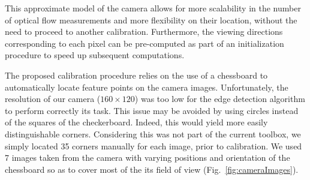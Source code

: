 This approximate model of the camera allows for more scalability in the number of optical flow measurements and more flexibility on their location, without the need to proceed to another calibration. Furthermore, the viewing directions corresponding to each pixel can be pre-computed as part of an initialization procedure to speed up subsequent computations.

The proposed calibration procedure relies on the use of a chessboard to automatically locate feature points on the camera images. Unfortunately, the resolution of our camera ($160 \times 120$) was too low for the edge detection algorithm to perform correctly its task. This issue may be avoided by using circles instead of the squares of the checkerboard. Indeed, this would yield more easily distinguishable corners. Considering this was not part of the current toolbox, we simply located 35 corners manually for each image, prior to calibration. We used 7 images taken from the camera with varying positions and orientation of the chessboard so as to cover most of the its field of view (Fig.~\ref{fig:cameraImages}). 

